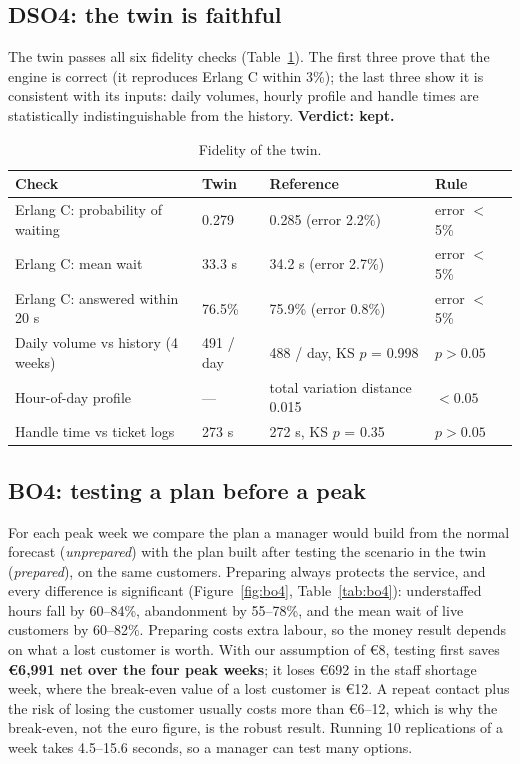 \subsection{DSO4: the twin is faithful}
The twin passes all six fidelity checks (Table~\ref{tab:fidelity}). The first three prove that the engine is
correct (it reproduces Erlang C within 3\%); the last three show it is consistent with its inputs: daily volumes,
hourly profile and handle times are statistically indistinguishable from the history. \textbf{Verdict: kept.}

\begin{table}[!htbp]
\centering\small
\caption{Fidelity of the twin.}
\label{tab:fidelity}
\begin{tabular}{@{}llll@{}}
\toprule
\textbf{Check} & \textbf{Twin} & \textbf{Reference} & \textbf{Rule} \\
\midrule
Erlang C: probability of waiting & 0.279 & 0.285 (error 2.2\%) & error $<$ 5\% \\
Erlang C: mean wait & 33.3 s & 34.2 s (error 2.7\%) & error $<$ 5\% \\
Erlang C: answered within 20 s & 76.5\% & 75.9\% (error 0.8\%) & error $<$ 5\% \\
Daily volume vs history (4 weeks) & 491 / day & 488 / day, KS $p$ = 0.998 & $p > 0.05$ \\
Hour-of-day profile & --- & total variation distance 0.015 & $< 0.05$ \\
Handle time vs ticket logs & 273 s & 272 s, KS $p$ = 0.35 & $p > 0.05$ \\
\bottomrule
\end{tabular}
\end{table}

\subsection{BO4: testing a plan before a peak}
For each peak week we compare the plan a manager would build from the normal forecast (\emph{unprepared})
with the plan built after testing the scenario in the twin (\emph{prepared}), on the same customers. Preparing
always protects the service, and every difference is significant (Figure~\ref{fig:bo4}, Table~\ref{tab:bo4}):
understaffed hours fall by 60--84\%, abandonment by 55--78\%, and the mean wait of live customers by 60--82\%.
Preparing costs extra labour, so the money result depends on what a lost customer is worth. With our
assumption of €8, testing first saves \textbf{€6,991 net over the four peak weeks}; it loses €692 in the staff
shortage week, where the break-even value of a lost customer is €12. A repeat contact plus the risk of losing
the customer usually costs more than €6--12, which is why the break-even, not the euro figure, is the robust
result. Running 10 replications of a week takes 4.5--15.6 seconds, so a manager can test many options.

